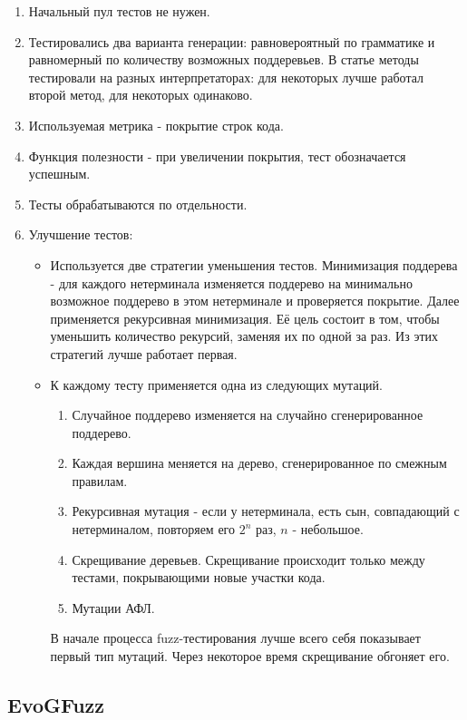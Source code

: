 \documentclass[a4paper]{article}
\begin{document}
\begin{enumerate}
\item Начальный пул тестов не нужен.
\item Тестировались два варианта генерации: равновероятный по грамматике и равномерный по количеству возможных поддеревьев. В статье методы тестировали на разных интерпретаторах: для некоторых лучше работал второй метод, для некоторых одинаково.
\item Используемая метрика - покрытие строк кода.
\item Функция полезности - при увеличении покрытия, тест обозначается успешным.
\item Тесты обрабатываются по отдельности.
\item Улучшение тестов:
    \begin{itemize}
        \item Используется две стратегии уменьшения тестов. Минимизация поддерева - для каждого нетерминала изменяется поддерево на минимально возможное поддерево в этом нетерминале и проверяется покрытие. Далее применяется рекурсивная минимизация. Её цель состоит в том, чтобы уменьшить количество рекурсий, заменяя их по одной за раз. Из этих стратегий лучше работает первая.
        \item К каждому тесту применяется одна из следующих мутаций. 
        \begin{enumerate}    
        \item Случайное поддерево изменяется на случайно сгенерированное поддерево.
        \item Каждая вершина меняется на дерево, сгенерированное по смежным правилам.
        \item Рекурсивная мутация - если у нетерминала, есть сын, совпадающий с нетерминалом, повторяем его $ 2^n $ раз, $ n $ - небольшое.
        \item Скрещивание деревьев. Скрещивание происходит только между тестами, покрывающими новые участки кода.
        \item Мутации АФЛ.
        \end{enumerate}
        В начале процесса fuzz-тестирования лучше всего себя показывает первый тип мутаций. Через некоторое время скрещивание обгоняет его.
    \end{itemize}
\end{enumerate}

\subsection{EvoGFuzz}
\indent
\end{document}
